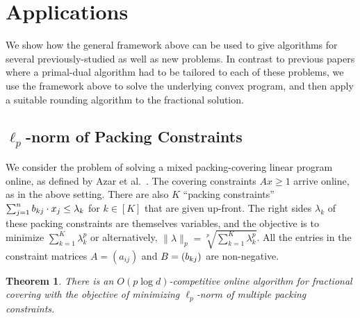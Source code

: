 \documentclass[letterpaper,11pt]{article}
\newtheorem{thm}{Theorem}[section]
\begin{document}
\section{Applications}
\label{sec:applications}

We show how the general framework above can be used to give algorithms
for several previously-studied as well as new problems. In contrast to previous papers
where a primal-dual algorithm had to be tailored to each of these
problems, we use the framework above to solve the underlying convex
program, and then apply a suitable rounding algorithm to the fractional
solution.

\subsection{$\ell_p$-norm of Packing Constraints}
\label{sec:Lp-norm-packing}

We consider the problem of solving a mixed packing-covering linear
program online, as defined by Azar et al.~\cite{ABFP13}. The covering
constraints $Ax\ge 1$ arrive online, as in the above setting. There are
also $K$ ``packing constraints'' $\sum_{j=1}^n b_{kj}\cdot x_j \le
\lambda_k$ for $k\in [K]$ that are given up-front. The right sides
$\lambda_k$ of these packing constraints are themselves variables, and
the objective is to minimize $\sum_{k=1}^K \lambda_k^p$  or alternatively, $\|\lambda\|_p=\sqrt[p]{\sum_{k=1}^K \lambda_k^p}$. All the entries
in the constraint matrices $A = (a_{ij})$ and $B=(b_{kj})$ are
non-negative.

\begin{thm}
  \label{thm:p-norm}
  There is an $O(p\log d)$-competitive online algorithm for fractional
  covering with the objective of minimizing $\ell_p$-norm of multiple
  packing constraints.
\end{thm}
\end{document}

